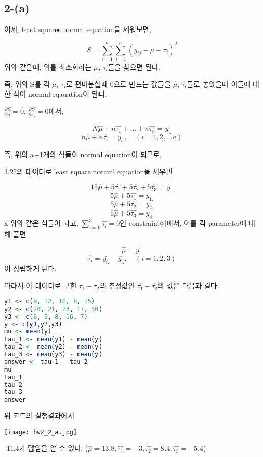 \documentclass{article}
\begin{document}
\subsection{2-(a)}



이제, least squares normal equation을 세워보면,

$$S = \sum_{i=1}^{a} \sum_{j=1}^{n} (y_{ij} - \mu - \tau_i)^2 $$
위와 같을때, 위를 최소화하는 $\mu$, $\tau_i$들을 찾으면 된다.

즉, 위의 S를 각 $\mu$, $\tau_i$로 편미분할때 0으로 만드는 값들을 $\hat{\mu}$, $\hat{\tau_i}$들로 놓았을때 이들에 대한 식이 normal eqauation이 된다.

$\frac{\partial S}{\partial \mu} = 0$, $\frac{\partial S}{\partial \tau_i} = 0$에서,

$$N \hat{\mu} + n \hat{\tau_1} + ... + n \hat{\tau_a} = y_{..} $$
$$n \hat{\mu} + n \hat{\tau_i} = y_{i.}, \quad (i = 1, 2, ... a)$$

즉, 위의 a+1개의 식들이 normal equation이 되므로,

3.22의 데이터로 least square noraml equation을 세우면

$$15 \hat{\mu} + 5 \hat{\tau_1} + 5 \hat{\tau_2} + 5 \hat{\tau_3} = y_{..}$$
$$5 \hat{\mu} + 5 \hat{\tau_1} = y_{1.}$$
$$5 \hat{\mu} + 5 \hat{\tau_2} = y_{2.}$$
$$5 \hat{\mu} + 5 \hat{\tau_3} = y_{3.}$$
x
위와 같은 식들이 되고, $\sum_{i=1}^{3} \hat{\tau_i} = 0$인 constraint하에서, 이를 각 parameter에 대해 풀면

$$\hat{\mu} = \bar{y_{..}}$$
$$\hat{\tau_i} = \bar{y_{i.}} - \bar{y_{..}}, \quad (i = 1,2,3)$$
이 성립하게 된다.

따라서 이 데이터로 구한 $\tau_1 - \tau_2$의 추정값인 $\hat{\tau_1} - \hat{\tau_2}$의 값은 다음과 같다.

\begin{lstlisting}[language=R]
y1 <- c(9, 12, 10, 8, 15)
y2 <- c(20, 21, 23, 17, 30)
y3 <- c(6, 5, 8, 16, 7)
y <- c(y1,y2,y3)
mu <- mean(y)
tau_1 <- mean(y1) - mean(y)
tau_2 <- mean(y2) - mean(y)
tau_3 <- mean(y3) - mean(y)
answer <- tau_1 - tau_2
mu
tau_1
tau_2
tau_3
answer
\end{lstlisting}

위 코드의 실행결과에서

\begin{center}
    \texttt{[image: hw2\_2\_a.jpg]}
\end{center} 

-11.4가 답임을 알 수 있다. ($\hat{\mu} = 13.8, \hat{\tau_1} = -3, \hat{\tau_2} = 8.4, \hat{\tau_3} = -5.4$)
\end{document}
